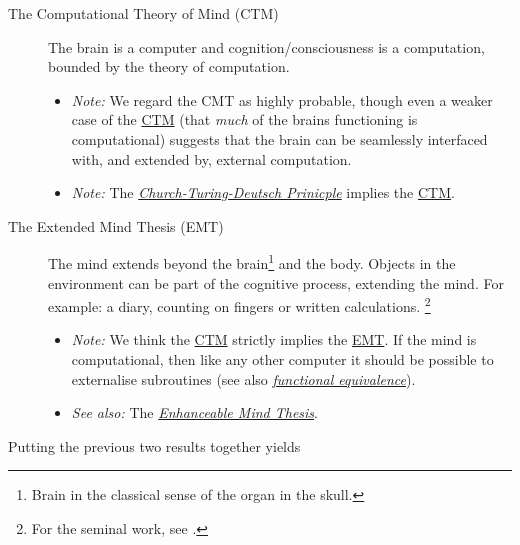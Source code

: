 \documentclass[logo,bsc,singlespacing,parskip]{infthesis}
\begin{document}
{ %
\begin{mdframed}
\begin{description}
\item[{The Computational Theory of Mind\label{computational theory of mind} (\label{org1b7df7a}CTM)}] The brain is a computer and cognition/consciousness is a computation, bounded by the theory of computation.
\begin{itemize}
\item \emph{Note:} We regard the CMT as highly probable, though even a weaker case of the \hyperref[org1b7df7a]{CTM} (that \emph{much} of the brains functioning is computational) suggests that the brain can be seamlessly interfaced with, and extended by, external computation.
\item \emph{Note:} The \emph{\hyperref[orge890011]{Church-Turing-Deutsch Prinicple}}  implies the \hyperref[org1b7df7a]{CTM}.
\end{itemize}
\end{description}
\end{mdframed}

\begin{mdframed}
\begin{description}
\item[{The Extended Mind Thesis\label{extended mind thesis} (\label{org6a0a28b}EMT)}] The mind extends beyond the brain\footnote{Brain in the classical sense of the organ in the skull.} and the body.
Objects in the environment can be part of the cognitive process, extending the mind.
For example: a diary, counting on fingers or written calculations. \footnote{For the seminal work, see \autocite{ExtendedMindAndy}.}
\begin{itemize}
\item \emph{Note:} We think the \hyperref[org1b7df7a]{CTM} strictly implies the \hyperref[org6a0a28b]{EMT}. If the mind is computational, then like any other computer it should be possible to externalise subroutines (see also \emph{\hyperref[orge7d4074]{functional equivalence}}).
\item \emph{See also:} The \emph{\hyperref[org7d3a30b]{Enhanceable Mind Thesis}}.
\end{itemize}
\end{description}
\end{mdframed}

Putting the previous two results together yields

}
\end{document}
